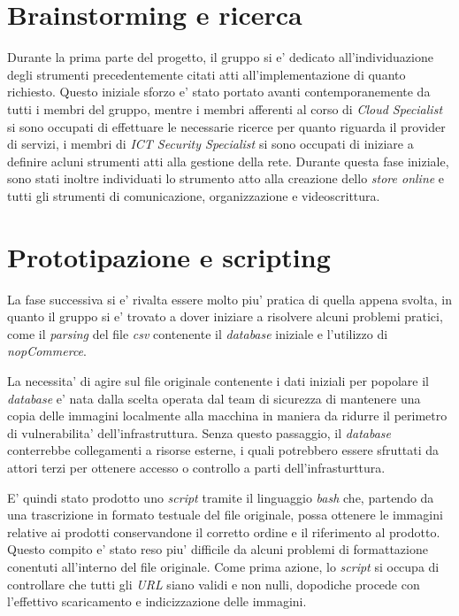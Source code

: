 \documentclass[a4paper]{report}
\begin{document}
	\section{Brainstorming e ricerca}
		Durante la prima parte del progetto, il gruppo si e' dedicato all'individuazione degli strumenti precedentemente
		citati atti all'implementazione di quanto richiesto. Questo iniziale sforzo e' stato portato avanti
		contemporanemente da tutti i membri del gruppo, mentre i membri afferenti al corso di \emph{Cloud Specialist} si
		sono occupati di effettuare le necessarie ricerce per quanto riguarda il provider di servizi, i membri di
		\emph{ICT Security Specialist} si sono occupati di iniziare a definire acluni strumenti atti alla gestione della
		rete.
		Durante questa fase iniziale, sono stati inoltre individuati lo strumento atto alla creazione dello \emph{store
		online} e tutti gli strumenti di comunicazione, organizzazione e videoscrittura.
	\section{Prototipazione e scripting}
		La fase successiva si e' rivalta essere molto piu' pratica di quella appena svolta, in quanto il gruppo si e'
		trovato a dover iniziare a risolvere alcuni problemi pratici, come il \emph{parsing} del file \emph{csv}
		contenente il \emph{database} iniziale e l'utilizzo di \emph{nopCommerce}.

		La necessita' di agire sul file originale contenente i dati iniziali per popolare il \emph{database} e' nata
		dalla scelta operata dal team di sicurezza di mantenere una copia delle immagini localmente alla macchina in
		maniera da ridurre il perimetro di vulnerabilita' dell'infrastruttura. Senza questo passaggio, il
		\emph{database} conterrebbe collegamenti a risorse esterne, i quali potrebbero essere sfruttati da attori
		terzi per ottenere accesso o controllo a parti dell'infrasturttura.

		E' quindi stato prodotto uno \emph{script} tramite  il linguaggio \emph{bash} che, partendo da una trascrizione
		in formato testuale del file originale, possa ottenere le immagini relative ai prodotti conservandone il
		corretto ordine e il riferimento al prodotto. Questo compito e' stato reso piu' difficile da alcuni problemi di
		formattazione conentuti all'interno del file originale. Come prima azione, lo \emph{script} si occupa di
		controllare che tutti gli \emph{URL} siano validi e non nulli, dopodiche procede con l'effettivo scaricamento e
		indicizzazione delle immagini.
\end{document}
